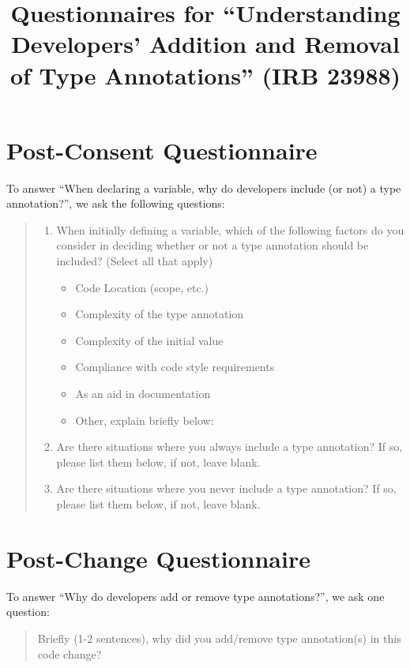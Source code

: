 \documentclass[paper=letter,fontsize=11pt,DIV=14]{scrartcl}
\title{Questionnaires for ``Understanding Developers' Addition and Removal of Type Annotations'' (IRB 23988)}
\author{}
\date{}
\begin{document}
\maketitle

\section*{Post-Consent Questionnaire}

To answer \enquote{When declaring a variable, why do developers include (or not) a type annotation?}, we ask the following questions:

\begin{quote}
  \begin{enumerate}
  \item When initially defining a variable, which of the following factors do you consider in deciding whether or not a type annotation should be included? (Select all that apply)
    \begin{itemize}[label=$\square$]
    \item Code Location (scope, etc.)
    \item Complexity of the type annotation
    \item Complexity of the initial value
    \item Compliance with code style requirements
    \item As an aid in documentation
    \item Other, explain briefly below:
    \end{itemize}
  \item Are there situations where you always include a type annotation?
    If so, please list them below, if not, leave blank.
  \item Are there situations where you never include a type annotation?
    If so, please list them below, if not, leave blank.
  \end{enumerate}
\end{quote}


\section*{Post-Change Questionnaire}

To answer \enquote{Why do developers add or remove type annotations?}, we ask one question:

\begin{quote}
  Briefly (1-2 sentences), why did you add/remove type annotation(s) in this code change?
\end{quote}
\end{document}
